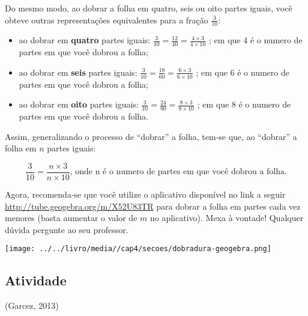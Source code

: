 \documentclass[a4,12pt]{book}
\begin{document}
\begin{refletindo*}
Do mesmo modo, ao dobrar a folha em quatro, seis ou oito partes iguais, você obteve outras representações equivalentes para a fração $\frac{3}{10}$:
\begin{itemize} %
  \item     ao dobrar em     {\bf quatro}     partes iguais:     $\frac{3}{10} = \frac{12}{40} = \frac{4 \times 3}{4 \times 10}$    ; em que 4 é o numero de partes em que você dobrou a folha;
  \item     ao dobrar em     {\bf seis}     partes iguais:     $\frac{3}{10} = \frac{18}{60} = \frac{6 \times 3}{6 \times 10}$    ; em que 6 é o numero de partes em que você dobrou a folha;
  \item     ao dobrar em     {\bf oito}     partes iguais:     $\frac{3}{10} = \frac{24}{80} = \frac{8 \times 3}{8 \times 10}$    ; em que 8 é o numero de partes em que você dobrou a folha.
\end{itemize} %


Assim, generalizando o processo de ``dobrar'' a folha, tem-se que, ao ``dobrar'' a folha em $n$ partes iguais:

$$\dfrac{3}{10}=\dfrac{n \times 3}{n \times 10}\text{, onde n é o numero de partes em que você dobrou a folha.}$$

Agora, recomenda-se que você utilize o aplicativo disponível no link a seguir \url{http://tube.geogebra.org/m/X52U83TR} para dobrar a folha em partes cada vez menores (basta aumentar o valor de $m$ no aplicativo). Mexa à vontade! Qualquer dúvida pergunte ao seu professor.

\texttt{[image: ../../livro/media//cap4/secoes/dobradura-geogebra.png]}

\end{refletindo*}


\subsection{Atividade}

(Garcez, 2013)
\end{document}

